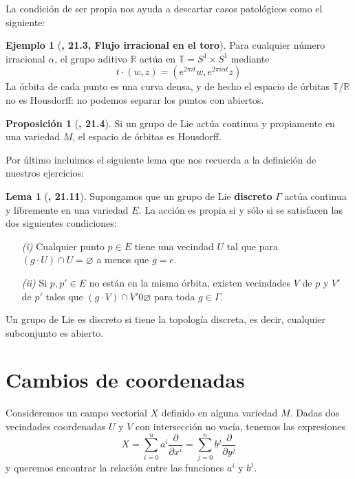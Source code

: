 \documentclass[spanish]{book}
\theoremstyle{definition}
\newtheorem*{prop}{Proposición}
\newtheorem*{lema}{Lema}
\newtheorem*{ejem}{Ejemplo}
\newcommand{\R}{\mathbb{R}}
\begin{document}
	La condición de ser propia nos ayuda a descartar casos patológicos como el siguiente:
	\begin{ejem}[\cite{Lee}\textbf{, 21.3, Flujo irracional en el toro}]
		Para cualquier número irracional $\alpha$, el grupo aditivo $\R$ actúa en $\mathbb{T}=S^1\times S^1$ mediante
		\[t\cdot (w,z)=(e^{2\pi it}w,e^{2\pi i\alpha t}z)\]
		La órbita de cada punto es una curva densa, y de hecho el espacio de órbitas $\mathbb{T}/\R$ no es Housdorff: no podemos separar los puntos con abiertos.
	\end{ejem}
	\begin{prop}[\cite{Lee}\textbf{, 21.4}]
		Si un grupo de Lie actúa continua y propiamente en una variedad $M$, el espacio de órbitas es Housdorff.
	\end{prop}
	Por último incluimos el siguiente lema que nos recuerda a la definición de nuestros ejercicios:
	\begin{lema}[\cite{Lee}\textbf{, 21.11}]
		Supongamos que un grupo de Lie \textbf{discreto} $\Gamma$ actúa continua y libremente en una variedad $E$. La acción es propia si y sólo si se satisfacen las dos siguientes condiciones:
		\begin{enumerate}
			\item [\textit{(i)}] Cualquier punto $p\in E$ tiene una vecindad $U$ tal que para $(g\cdot U)\cap U=\varnothing$ a menos que $g=e$.
			\item [\textit{(ii)}] Si $p, p'\in E$ no están en la misma órbita, existen vecindades $V$ de $p$ y $V'$ de $p'$ tales que $(g\cdot V)\cap V'0\varnothing$ para toda $g\in\Gamma$.
		\end{enumerate}
	\end{lema}
	Un grupo de Lie es discreto si tiene la topología discreta, es decir, cualquier subconjunto es abierto.
	\section{Cambios de coordenadas}
	Consideremos un campo vectorial $X$ definido en alguna variedad $M$. Dadas dos vecindades coordenadas $U$ y $V$ con intersección no vacía, tenemos las expresiones
	\[X=\sum_{i=0}^na^i\frac{\partial}{\partial x^i}=\sum_{j=0}^nb^j\frac{\partial}{\partial y^j}\]
	y queremos encontrar la relación entre las funciones $a^i$ y $b^j$.
	
\end{document}

